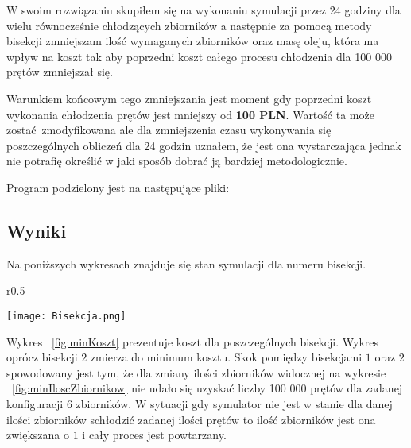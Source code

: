 \documentclass[varwidth,12pt,a4paper]{article}
\begin{document}
W swoim rozwiązaniu skupiłem się na wykonaniu symulacji przez 24 godziny dla wielu 
równocześnie chłodzących zbiorników a następnie za pomocą metody bisekcji zmniejszam
ilość wymaganych zbiorników oraz masę oleju, która ma wpływ na koszt tak aby poprzedni koszt
całego procesu chłodzenia dla 100 000 prętów zmniejszał się. 

Warunkiem końcowym tego zmniejszania jest moment gdy poprzedni koszt wykonania chłodzenia
prętów jest mniejszy od \textbf{100 PLN}. Wartość ta może zostać zmodyfikowana ale dla
zmniejszenia czasu wykonywania się poszczególnych obliczeń dla 24 godzin uznałem, że jest
ona wystarczająca jednak nie potrafię określić w jaki sposób dobrać ją bardziej metodologicznie.

Program podzielony jest na następujące pliki:




\subsection{Wyniki}

Na poniższych wykresach znajduje się stan symulacji dla numeru bisekcji.

\begin{wrapfigure}{r}{0.5\textwidth}
  \vspace{-20pt}
  \begin{center}
    \texttt{[image: Bisekcja.png]}
    \label{fig:minKoszt}
  \end{center}
  \vspace{-20pt}
  \caption{Koszt chłodzenia prętów}
  \vspace{30pt}
\end{wrapfigure}

Wykres ~\ref{fig:minKoszt} prezentuje koszt dla poszczególnych bisekcji. Wykres oprócz bisekcji $2$
zmierza do minimum kosztu. Skok pomiędzy bisekcjami $1$ oraz $2$ spowodowany jest tym, że dla zmiany
ilości zbiorników widocznej na wykresie ~\ref{fig:minIloscZbiornikow} nie udało się uzyskać liczby
100 000 prętów dla zadanej konfiguracji $6$ zbiorników. W sytuacji gdy symulator nie jest w stanie
dla danej ilości zbiorników schłodzić zadanej ilości prętów to ilość zbiorników jest ona zwiększana o $1$ i cały
proces jest powtarzany. 
\end{document}
